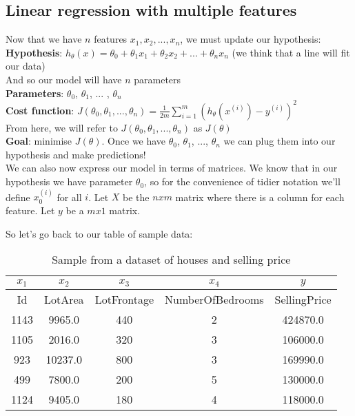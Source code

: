 \documentclass[11pt]{article}
\begin{document}
\subsection{Linear regression with multiple features}

Now that we have $n$ features $x_1, x_2, ..., x_n$, we must update our hypothesis:\\

\textbf{Hypothesis}: $h_\theta(x) = \theta_0 + \theta_1x_1+ \theta_2x_2 + ... +  \theta_nx_n$ (we think that a line will fit our data) \\

And so our model will have $n$ parameters \\

\textbf{Parameters}: $\theta_0$, $\theta_1$, ... , $\theta_n$ \\

\textbf{Cost function}: \(J(\theta_0, \theta_1,..., \theta_n) = \frac{1}{2m} \sum^m_{i=1}(h_\theta(x^{(i)}) - y^{(i)})^2\) \\

From here, we will refer to $J(\theta_0, \theta_1,..., \theta_n) $ as $J(\theta)$\\

\textbf{Goal}: minimise $J(\theta)$. Once we have $\theta_0$, $\theta_1$, ..., $\theta_n$ we can plug them into our hypothesis and make predictions!\\

We can also now express our model in terms of matrices. We know that in our hypothesis we have parameter $\theta_0$, so for the convenience of tidier notation we'll define $x_0^{(i)}$ for all $i$. Let $X$ be the $n x m$ matrix where there is a column for each feature. Let $y$ be a $m x 1$ matrix.

So let's go back to our table of sample data: 
\begin{table}[htp]
\caption{Sample from a dataset of houses and selling price}
\label{table:sample-ames}
\begin{center}
\begin{tabular}{|c|c|c|c|c|}
\hline
$x_1$ & $x_2$ & $x_3$ & $x_4$ & $y$\\ \hline
Id & LotArea & LotFrontage & NumberOfBedrooms & SellingPrice \\ \hline
1143 & 9965.0 & 440 & 2 & 424870.0 \\
1105 & 2016.0 & 320 & 3 & 106000.0 \\
923 & 10237.0 & 800 & 3 & 169990.0\\
499& 7800.0 & 200 & 5 & 130000.0\\
1124 & 9405.0 & 180 & 4 & 118000.0 \\
\hline
\end{tabular}
\end{center}
\label{Sample housing price data}
\end{table}%
\end{document}
